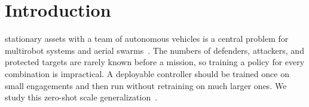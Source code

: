\section{Introduction}
\label{sec:intro}

 stationary assets with a team of autonomous vehicles is a central problem for multirobot systems and aerial swarms~\cite{garcia2019activedefense,shishika2020perimeter,zhao2024swarmdefense,wu2025swarm}. The numbers of defenders, attackers, and protected targets are rarely known before a mission, so training a policy for every combination is impractical. A deployable controller should be trained once on small engagements and then run without retraining on much larger ones. We study this zero-shot scale generalization~\cite{kirk2023zsg,iqbal2021refil}.

